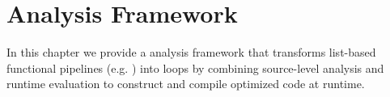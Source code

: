 \chapter{Analysis Framework}
In this chapter we provide a \javascript analysis framework that transforms list-based functional pipelines (e.g. ) into  loops by combining source-level analysis and runtime evaluation to construct and compile optimized code at runtime.  




